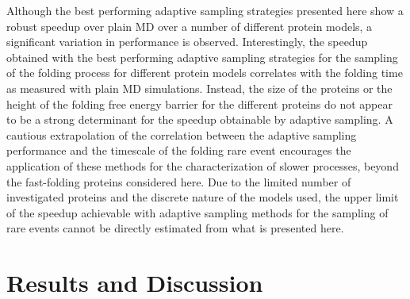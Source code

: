 Although the best performing adaptive sampling strategies presented here show a
robust speedup over plain MD over a number of different protein models, a significant
variation in performance is observed. Interestingly, the
speedup obtained with the best performing adaptive sampling strategies for
the sampling of the folding process for different protein models correlates
with the folding time as measured with plain MD simulations.
Instead, the size of the proteins or the height of the folding free energy
barrier for the different proteins do not appear to be a strong determinant for
the speedup obtainable by adaptive sampling.
A cautious extrapolation of the correlation between the adaptive sampling
performance and the timescale of the folding rare event encourages the
application of these methods for the characterization of slower processes,
beyond the fast-folding proteins considered here. Due to the limited
number of investigated proteins and the discrete nature of the models used,
the upper limit of the speedup achievable with adaptive sampling methods
for the sampling of rare events cannot be directly estimated from what is
presented here.

\section{\label{sec:res}Results and Discussion}